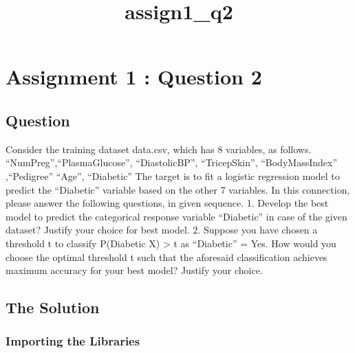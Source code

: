 \documentclass[11pt]{article}
\title{assign1\_q2}
\begin{document}
    
    
    \maketitle
    
    

    
    \hypertarget{assignment-1-question-2}{%
\section{Assignment 1 : Question 2}\label{assignment-1-question-2}}

    \hypertarget{question}{%
\subsection{Question}\label{question}}

    Consider the training dataset data.csv, which has 8 variables, as
follows. ``NumPreg'',``PlasmaGlucose'', ``DiastolicBP'', ``TricepSkin'',
``BodyMassIndex'' ,``Pedigree'' ``Age'', ``Diabetic'' The target is to
fit a logistic regression model to predict the ``Diabetic'' variable
based on the other 7 variables. In this connection, please answer the
following questions, in given sequence. 1. Develop the best model to
predict the categorical response variable ``Diabetic'' in case of the
given dataset? Justify your choice for best model. 2. Suppose you have
chosen a threshold t to classify P(Diabetic \textbar{} X) \textgreater{}
t as ``Diabetic'' = Yes. How would you choose the optimal threshold t
such that the aforesaid classification achieves maximum accuracy for
your best model? Justify your choice.

    \hypertarget{the-solution}{%
\subsection{The Solution}\label{the-solution}}

    \hypertarget{importing-the-libraries}{%
\subsubsection{Importing the Libraries}\label{importing-the-libraries}}
\end{document}
